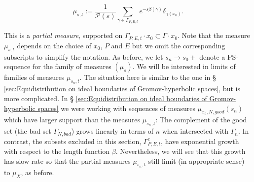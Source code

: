 \documentclass[12pt]{amsbook}%
\theoremstyle{definition}
\theoremstyle{remark}
\numberwithin{section}{chapter}
\numberwithin{subsection}{section}
\numberwithin{figure}{chapter}
\def\cP{{\mathscr{P}}}
\def\Ga{\Gamma}
\begin{document}
{{\begin{equation}\label{eq:def_mu_st}
\mu_{s,t}:= \dfrac{1}{\cP(s)} \sum_{\gamma \in \Gamma_{P,E,t}} e^{-s \beta(\gamma)} \delta_{\gamma(x_0)}. 
\end{equation}

This is a {\em partial measure}, supported on $\Ga_{P,E,t} \cdot x_0\subset \Ga \cdot x_0$. Note that the measure $\mu_{s,t}$ depends on the choice of $x_0$, $P$ and $E$ but we omit the corresponding subscripts to simplify the notation. As before, we let $s_n\to s_0+$ denote a PS-sequence for the family of measures $(\mu_s)$. We will be interested in limits of families of measures $\mu_{s_n,t}$. The situation here is similar to the one in \S 
\ref{sec:Equidistribution on ideal boundaries of Gromov-hyperbolic spaces},  but is more complicated. In \S 
\ref{sec:Equidistribution on ideal boundaries of Gromov-hyperbolic spaces} we were working with sequences of measures 
$\mu_{x_0, N, good}(s_n)$ which have larger support than the measures  $\mu_{s_n,t}$: The  complement of the good set (the bad set $\Ga_{N,bad}$) 
 grows linearly in terms of $n$ when intersected with $\Ga_n$. In contrast, the subsets  excluded in this section,  
$\Gamma_{P,E,t}^c$, have exponential growth with respect to the length function $\beta$. Nevertheless, we will see that this growth has slow rate so that the partial measures $\mu_{s_n,t}$ still limit (in appropriate sense) to $\mu_{X}$, as before. 




}}
\end{document}
